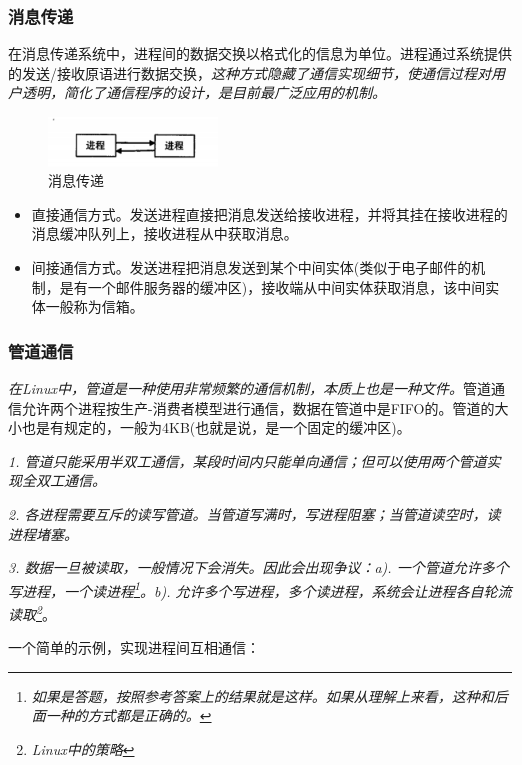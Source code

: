 \subsubsection{消息传递}

    在消息传递系统中，进程间的数据交换以格式化的信息为单位。进程通过系统提供的发送/接收原语进行数据交换，\emph{这种方式隐藏了通信实现细节，使通信过程对用户透明，简化了通信程序的设计，是目前最广泛应用的机制。}

\begin{figure}[!htbp]
    \centering
    \includegraphics[width=0.4\textwidth]{image/chapter02/消息传递.png}
    \caption{消息传递}  
\end{figure}

\begin{itemize}
    \item [1)] 直接通信方式。发送进程直接把消息发送给接收进程，并将其挂在接收进程的消息缓冲队列上，接收进程从中获取消息。
    \item [2)] 间接通信方式。发送进程把消息发送到某个中间实体(类似于电子邮件的机制，是有一个邮件服务器的缓冲区)，接收端从中间实体获取消息，该中间实体一般称为信箱。
\end{itemize}

\subsubsection{管道通信}

    \emph{在Linux中，管道是一种使用非常频繁的通信机制，本质上也是一种文件。}管道通信允许两个进程按生产-消费者模型进行通信，数据在管道中是FIFO的。管道的大小也是有规定的，一般为4KB(也就是说，是一个固定的缓冲区)。

    \emph{1. 管道只能采用半双工通信，某段时间内只能单向通信；但可以使用两个管道实现全双工通信。}

    \emph{2. 各进程需要互斥的读写管道。当管道写满时，写进程阻塞；当管道读空时，读进程堵塞。}

    \emph{3. 数据一旦被读取，一般情况下会消失。因此会出现争议：a). 一个管道允许多个写进程，一个读进程\footnote[1]{\emph{如果是答题，按照参考答案上的结果就是这样。如果从理解上来看，这种和后面一种的方式都是正确的。}}。b). 允许多个写进程，多个读进程，系统会让进程各自轮流读取\footnote[2]{\emph{Linux中的策略}}}。

    一个简单的示例，实现进程间互相通信：

